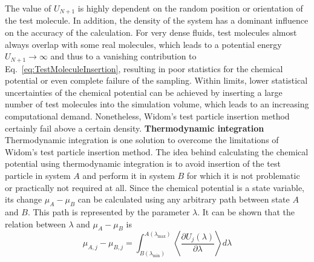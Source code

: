 The value of $U_{N+1}$ is highly dependent on the random position or orientation of the test molecule. In addition, the density of the system has a dominant influence on the accuracy of the calculation. For very dense fluids, test molecules almost always overlap with some real molecules, which leads to a potential energy $U_{N+1}\rightarrow \infty$ and thus to a vanishing contribution to Eq.~\eqref{eq:TestMoleculeInsertion}, resulting in poor statistics for the chemical potential or even complete failure of the sampling. Within limits, lower statistical uncertainties of the chemical potential can be achieved by inserting a large number of test molecules into the simulation volume, which leads to an increasing computational demand. Nonetheless, Widom's test particle insertion method certainly fail above a certain density.
\newline \newline
\textbf{Thermodynamic integration}\\
Thermodynamic integration is one solution to overcome the limitations of Widom's test particle insertion method. The idea behind calculating the chemical potential using thermodynamic integration is to avoid insertion of the test particle in system $A$ and perform it in system $B$ for which it is not problematic or practically not required at all. Since the chemical potential is a state variable, its change $\mu_A-\mu_B$ can be calculated using any arbitrary path between state $A$ and $B$. This path is represented by the parameter $\lambda$. It can be shown \cite{Frenkel} that the relation between $\lambda$ and $\mu_A-\mu_B$ is 
\begin{equation}
\mu_{A,j}-\mu_{B,j}=\int_{B(\lambda_\text{min})}^{A(\lambda_\text{max})} \left\langle \frac{\partial U_j(\lambda)}{\partial \lambda} \right\rangle d \lambda 
\label{eq:thermoint}
\end{equation}
